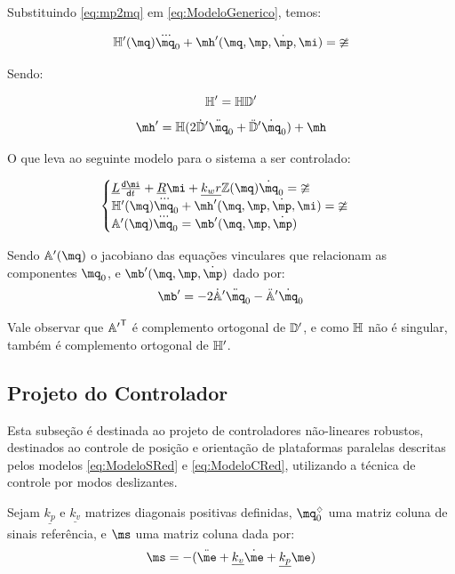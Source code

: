\documentclass[a4paper,11pt,brazil,fleqn]{article}
\begin{document}
Substituindo \eqref{eq:mp2mq} em \eqref{eq:ModeloGenerico}, temos:

\begin{equation}
\mH'(\mq) \dddot{\mq}_0 + \mh'(\mq,\mp,\dot{\mp}, \mi) = \mup
\end{equation}

Sendo:

\begin{equation}
\mathbb{H}' = \mathbb{H} \mathbb{D}'
\end{equation}
\begin{equation}
\mh' = \mH( 2\dot{\mD}' \ddot{\mq}_0 + \ddot{\mD}' \dot{\mq}_0 ) + \mh
\end{equation}

O que leva ao seguinte modelo para o sistema a ser controlado:

\begin{equation} \label{eq:ModeloCRed}
\begin{cases}
\underline{L} \frac{\dd \mi}{\dd t} + \underline{R} \mi + \underline{k_w r} \mZ (\mq) \dot{\mq}_0= \mup
\\
\mH'(\mq) \dddot{\mq}_0 + \mh'(\mq,\mp,\dot{\mp}, \mi) = \mup
\\
\mA'(\mq) \dddot{\mq}_0 = \mb'(\mq,\mp,\dot{\mp})
\end{cases}
\end{equation}

Sendo $\mA'(\mq)$ o jacobiano das equa\c{c}\~oes vinculares que relacionam as componentes $\mq_0$, e  $\mb'(\mq,\mp,\dot{\mp})$ dado por:
\begin{equation}
\mb' = -2 \dot{\mA}' \ddot{\mq}_0 - \ddot{\mA}' \dot{\mq}_0
\end{equation}

Vale observar que ${\mathbb{A}'}^{\mathsf{T}}$ \'e complemento ortogonal de $\mathbb{D}'$, e como $\mathbb{H}$ n\~ao \'e singular, tamb\'em \'e complemento ortogonal de $\mathbb{H}'$.

\subsection{Projeto do Controlador}\label{S04-6}

Esta subse\c{c}\~ao \'e destinada ao projeto de controladores n\~ao-lineares robustos, destinados ao controle de posi\c{c}\~ao e orienta\c{c}\~ao de plataformas paralelas descritas pelos modelos \eqref{eq:ModeloSRed} e \eqref{eq:ModeloCRed}, utilizando a t\'ecnica de controle por modos deslizantes.

Sejam $\underline{k_p}$ e $\underline{k_v}$ matrizes diagonais positivas definidas, $\mq_0^\sdia$ uma matriz coluna de sinais refer\^encia, e $\ms$ uma matriz coluna dada por:
\begin{equation} \label{eq:SlidingSurfaces}
\ms = -(\ddot{\me} + \underline{k_v}\dot{\me} + \underline{k_p}\me)
\end{equation} 
\end{document}
